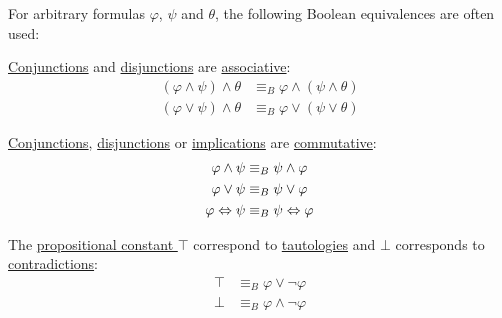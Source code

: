 \begin{proposition}\label{thm:boolean_equivalences}
  For arbitrary formulas \( \varphi \), \( \psi \) and \( \theta \), the following Boolean equivalences are often used:
  \begin{PropEnum}
     \hyperref[def:propositional_alphabet/connectives/conjunction]{Conjunctions} and \hyperref[def:propositional_alphabet/connectives/conjunction]{disjunctions} are \hyperref[def:magma/associative]{associative}:
    \begin{align}
      (\varphi \wedge \psi) \wedge \theta &\equiv_B \varphi \wedge (\psi \wedge \theta) \label{eq:def:boolean_equivalences/associativity/and} \\
      (\varphi \vee \psi) \wedge \theta   &\equiv_B \varphi \vee (\psi \vee \theta)     \label{eq:def:boolean_equivalences/associativity/or}
    \end{align}

     \hyperref[def:propositional_alphabet/connectives/conjunction]{Conjunctions}, \hyperref[def:propositional_alphabet/connectives/conjunction]{disjunctions} or \hyperref[def:propositional_alphabet/connectives/implication]{implications} are \hyperref[def:magma/commutative]{commutative}:
    \begin{align}
      \varphi \wedge \psi &\equiv_B \psi \wedge \varphi \label{eq:def:boolean_equivalences/commutativity/and} \\
      \varphi \vee \psi   &\equiv_B \psi \vee \varphi   \label{eq:def:boolean_equivalences/commutativity/or}  \\
      \varphi \Leftrightarrow \psi   &\equiv_B \psi \Leftrightarrow \varphi   \label{eq:def:boolean_equivalences/commutativity/iff}
    \end{align}

     The \hyperref[def:propositional_alphabet/constants/top]{propositional constant \( \top \)} correspond to \hyperref[def:propositional_interpretation/tautology]{tautologies} and \hyperref[def:propositional_alphabet/constants/top]{\( \bot \)} corresponds to \hyperref[def:propositional_interpretation/tautology]{contradictions}:
    \begin{align}
      \top &\equiv_B \varphi \vee \neg \varphi   \label{eq:def:boolean_equivalences/constants/top} \\
      \bot &\equiv_B \varphi \wedge \neg \varphi \label{eq:def:boolean_equivalences/constants/bot}
    \end{align}


\end{PropEnum}
\end{proposition}
